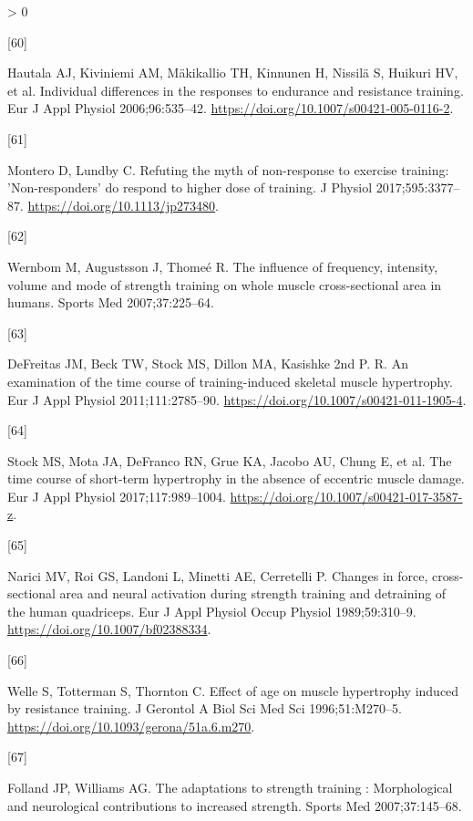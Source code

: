 \documentclass[twoside,10pt]{gihclass} %
\newlength{\cslhangindent}
\newlength{\csllabelwidth}
\newenvironment{CSLReferences}[3] %
 {%
  \setlength{\parindent}{0pt}
  \ifodd #1 \everypar{\setlength{\hangindent}{\cslhangindent}}\ignorespaces\fi
  \ifnum #2 > 0
  \setlength{\parskip}{#2\baselineskip}
  \fi
 }%
 {}
\newcommand{\CSLLeftMargin}[1]{\parbox[t]{\maxof{\widthof{#1}}{\csllabelwidth}}{#1}}
\newcommand{\CSLRightInline}[1]{\parbox[t]{\linewidth}{#1}}
\begin{document}
\begin{CSLReferences}{0}{0}
\leavevmode\hypertarget{ref-RN2681}{}%
\CSLLeftMargin{{[}60{]} }
\CSLRightInline{Hautala AJ, Kiviniemi AM, Mäkikallio TH, Kinnunen H, Nissilä S, Huikuri HV, et al. Individual differences in the responses to endurance and resistance training. Eur J Appl Physiol 2006;96:535--42. \url{https://doi.org/10.1007/s00421-005-0116-2}.}

\leavevmode\hypertarget{ref-RN2699}{}%
\CSLLeftMargin{{[}61{]} }
\CSLRightInline{Montero D, Lundby C. Refuting the myth of non-response to exercise training: 'Non-responders' do respond to higher dose of training. J Physiol 2017;595:3377--87. \url{https://doi.org/10.1113/jp273480}.}

\leavevmode\hypertarget{ref-RN346}{}%
\CSLLeftMargin{{[}62{]} }
\CSLRightInline{Wernbom M, Augustsson J, Thomeé R. The influence of frequency, intensity, volume and mode of strength training on whole muscle cross-sectional area in humans. Sports Med 2007;37:225--64.}

\leavevmode\hypertarget{ref-RN1596}{}%
\CSLLeftMargin{{[}63{]} }
\CSLRightInline{DeFreitas JM, Beck TW, Stock MS, Dillon MA, Kasishke 2nd P. R. An examination of the time course of training-induced skeletal muscle hypertrophy. Eur J Appl Physiol 2011;111:2785--90. \url{https://doi.org/10.1007/s00421-011-1905-4}.}

\leavevmode\hypertarget{ref-RN2113}{}%
\CSLLeftMargin{{[}64{]} }
\CSLRightInline{Stock MS, Mota JA, DeFranco RN, Grue KA, Jacobo AU, Chung E, et al. The time course of short-term hypertrophy in the absence of eccentric muscle damage. Eur J Appl Physiol 2017;117:989--1004. \url{https://doi.org/10.1007/s00421-017-3587-z}.}

\leavevmode\hypertarget{ref-RN2736}{}%
\CSLLeftMargin{{[}65{]} }
\CSLRightInline{Narici MV, Roi GS, Landoni L, Minetti AE, Cerretelli P. Changes in force, cross-sectional area and neural activation during strength training and detraining of the human quadriceps. Eur J Appl Physiol Occup Physiol 1989;59:310--9. \url{https://doi.org/10.1007/bf02388334}.}

\leavevmode\hypertarget{ref-RN2739}{}%
\CSLLeftMargin{{[}66{]} }
\CSLRightInline{Welle S, Totterman S, Thornton C. Effect of age on muscle hypertrophy induced by resistance training. J Gerontol A Biol Sci Med Sci 1996;51:M270--5. \url{https://doi.org/10.1093/gerona/51a.6.m270}.}

\leavevmode\hypertarget{ref-RN767}{}%
\CSLLeftMargin{{[}67{]} }
\CSLRightInline{Folland JP, Williams AG. The adaptations to strength training : Morphological and neurological contributions to increased strength. Sports Med 2007;37:145--68.}


\end{CSLReferences}
\end{document}
